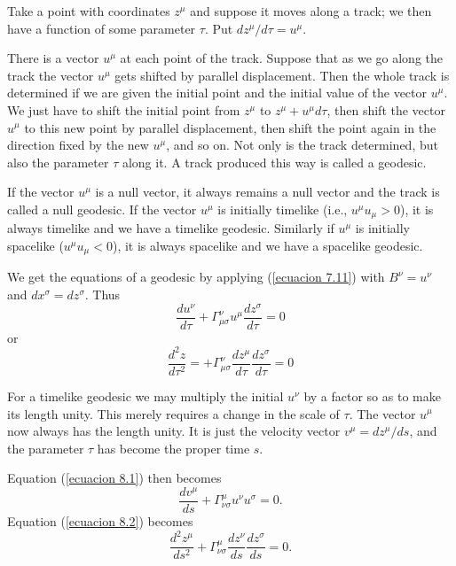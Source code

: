 Take a point with coordinates $z^\mu$ and suppose it moves along a track; we 
then have a function of some parameter $\tau$. Put $dz^\mu / d\tau = 
u^\mu$.

There is a vector $u^\mu$ at each point of the track. Suppose that as we go 
along the track the vector $u^\mu$ gets shifted by parallel displacement. Then 
the whole track is determined if we are given the initial point and the initial 
value of the vector $u^\mu$. We just have to shift the initial point from 
$z^\mu$ to $z^\mu + u^\mu d\tau$, then shift the vector $u^\mu$ to this new 
point by parallel displacement, then shift the point again in the direction 
fixed by the new  $u^\mu$, and so on. Not only is the track determined, but 
also the parameter $\tau$ along it. A track produced this way is called a 
geodesic.

If the vector $u^\mu$ is a null vector, it always remains a null vector and the 
track is called a null geodesic. If the vector $u^\mu$ is initially timelike 
(i.e., $u^\mu u_\mu > 0$), it is always timelike and we have a timelike 
geodesic. Similarly if $u^\mu$ is initially spacelike ($u^\mu u_\mu < 0$), it 
is always spacelike and we have a spacelike geodesic.

We get the equations of a geodesic by applying (\ref{ecuacion 7.11}) with 
$B^\nu = u^\nu$ and $dx^\sigma = dz^\sigma$. Thus 
\begin{equation}
 \label{ecuacion 8.1}
 \frac{d u^\nu}{d\tau} 
       + \Gamma^\nu_{\mu\sigma} u^\mu \frac{dz^\sigma}{d\tau} = 0
\end{equation}
or
\begin{equation}
 \label{ecuacion 8.2}
 \frac{d^2 z }{d \tau^2} =
      + \Gamma^\nu_{\mu\sigma} \frac{dz^\mu}{d\tau} \frac{dz^\sigma}{d\tau}  
      = 0
\end{equation}

For a timelike geodesic we may multiply the initial $u^\nu$ by a factor so as 
to make its length unity. This merely requires a change in the scale of $\tau$. 
The vector $u^\mu$ now always has the length unity. It is just the velocity 
vector $v^\mu = d z^\mu / ds$, and the parameter $\tau$ has become the proper 
time $s$.

Equation (\ref{ecuacion 8.1}) then becomes
\begin{equation}
 \label{ecuacion 8.3}
 \frac{dv^\mu}{ds} + \Gamma^\mu_{\nu\sigma} u^\nu u^\sigma = 0.
\end{equation}
Equation (\ref{ecuacion 8.2}) becomes 
\begin{equation}
 \label{ecuacion 8.4}
 \frac{d^2 z^\mu}{d s^2} + 
      \Gamma^\mu_{\nu\sigma}\frac{dz^\nu}{ds}\frac{dz^\sigma}{ds} = 0.
\end{equation}

